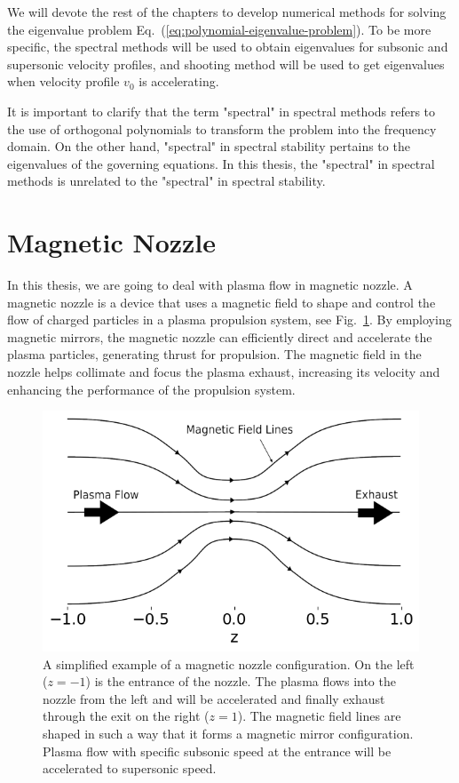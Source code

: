 We will devote the rest of the chapters to develop numerical methods for solving the eigenvalue problem Eq.~(\ref{eq:polynomial-eigenvalue-problem}). To be more specific, the spectral methods will be used to obtain eigenvalues for subsonic and supersonic velocity profiles, and shooting method will be used to get eigenvalues when velocity profile $v_0$ is accelerating.

It is important to clarify that the term "spectral" in spectral methods refers to the use of orthogonal polynomials to transform the problem into the frequency domain. On the other hand, "spectral" in spectral stability pertains to the eigenvalues of the governing equations. In this thesis, the "spectral" in spectral methods is unrelated to the "spectral" in spectral stability.

\section{Magnetic Nozzle}
In this thesis, we are going to deal with plasma flow in magnetic nozzle.
A magnetic nozzle is a device that uses a magnetic field to shape and control the flow of charged particles in a plasma propulsion system, see Fig.~\ref{fig:magnetic-nozzle}. By employing magnetic mirrors, the magnetic nozzle can efficiently direct and accelerate the plasma particles, generating thrust for propulsion. The magnetic field in the nozzle helps collimate and focus the plasma exhaust, increasing its velocity and enhancing the performance of the propulsion system.

\begin{figure}[htbp]
	\centering
	\includegraphics[width=0.7\linewidth]{figures/magnetic-nozzle.png}
	\caption{A simplified example of a magnetic nozzle configuration. On the left ($z=-1$) is the entrance of the nozzle. The plasma flows into the nozzle from the left and will be accelerated and finally exhaust through the exit on the right ($z=1$). The magnetic field lines are shaped in such a way that it forms a magnetic mirror configuration. Plasma flow with specific subsonic speed at the entrance will be accelerated to supersonic speed.}
	\label{fig:magnetic-nozzle}
\end{figure}

